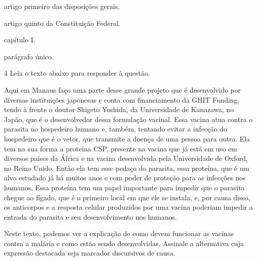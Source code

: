 \begin{escolha}
    
    \item artigo primeiro das disposições gerais.
    
    \item artigo quinto da Constituição Federal.
    
    \item capítulo I.
    
    \item parágrafo único.

\end{escolha}

\num{4} Leia o texto abaixo para responder à questão. 

\begin{myquote}

Aqui em Manaus faço uma parte desse grande projeto que é desenvolvido
por diversas instituições japonesas e conta com financiamento da GHIT
Funding, tendo à frente o doutor Shigeto Yoshida, da Universidade de
Kanazawa, no Japão, que é o desenvolvedor dessa formulação vacinal.
Essa vacina atua contra o parasita no hospedeiro humano e, também,
tentando evitar a infecção do hospedeiro que é o vetor, que transmite a
doença de uma pessoa para outra. Ela tem na sua forma a proteína CSP,
presente na vacina que já está em uso em diversos países da África e na
vacina desenvolvida pela Universidade de Oxford, no Reino Unido. Então
ela tem esse pedaço do parasita, essa proteína, que é um alvo estudado
já há muitos anos e com poder de proteção para as infecções nos humanos.
Essa proteína tem um papel importante para impedir que o parasita chegue
ao fígado, que é o primeiro local em que ele se instala, e, por causa
disso, os anticorpos e a resposta celular produzidos por uma vacina
poderiam impedir a entrada do parasita e seu desenvolvimento nos
humanos.

\end{myquote}


Neste texto, podemos ver a explicação de como devem funcionar as vacinas
contra a malária e como estão sendo desenvolvidas. Assinale a alternativa
cuja expressão destacada seja marcador discursivos de causa.

